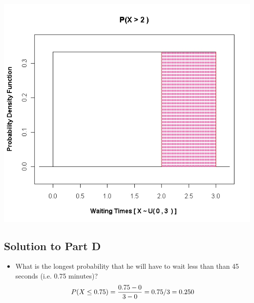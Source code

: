 \documentclass[a4paper,12pt]{article}
\begin{document}
{\begin{center}
\includegraphics[scale=0.35]{images/6AUniform4}

\end{center}

\subsection*{Solution to Part D}

\begin{itemize}
\item What is the longest probability that he will have to wait less than than 45 seconds (i.e. 0.75 minutes)?
\[ P(X \leq 0.75)  = {0.75 - 0 \over 3-0} = {0.75/3} = 0.250  \]
\end{itemize}

}




\end{document}
